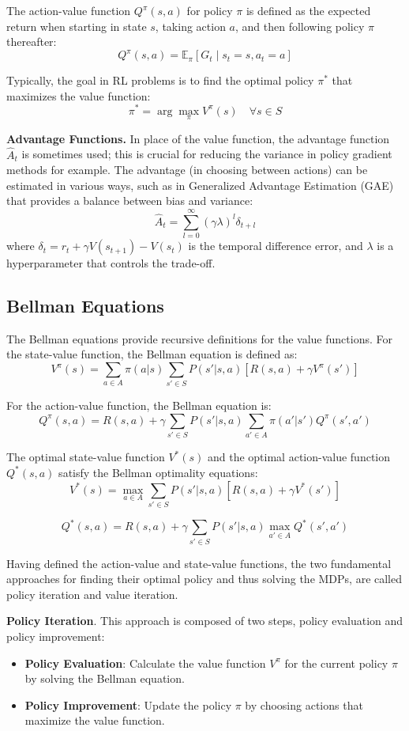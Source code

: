 The action-value function $Q^{\pi}(s, a)$ for policy $\pi$ is defined as the expected return when starting in state $s$, taking action $a$, and then following policy $\pi$ thereafter:
\[
Q^{\pi}(s, a) = \mathbb{E}_{\pi} \left[ G_t \mid s_t = s, a_t = a \right]
\]

Typically, the goal in \gls{RL} problems is to find the optimal policy $\pi^*$ that maximizes the value function:
\[
\pi^* = \arg\max_{\pi} V^{\pi}(s) \quad \forall s \in S
\]

\textbf{Advantage Functions.} In place of the value function, the advantage function $\hat{A}_t$ is sometimes used; this is crucial for reducing the variance in policy gradient methods for example.
The advantage (in choosing between actions) can be estimated in various ways, such as in Generalized Advantage Estimation (GAE) that provides a balance between bias and variance:
\[
\hat{A}_t = \sum_{l=0}^{\infty} (\gamma \lambda)^l \delta_{t+l}
\]
where $\delta_t = r_t + \gamma V(s_{t+1}) - V(s_t)$ is the temporal difference error, and $\lambda$ is a hyperparameter that controls the trade-off.

\subsection{Bellman Equations}

The Bellman equations provide recursive definitions for the value functions.
For the state-value function, the Bellman equation is defined as:
\[
V^{\pi}(s) = \sum_{a \in A} \pi(a|s) \sum_{s' \in S} P(s'|s,a) \left[ R(s,a) + \gamma V^{\pi}(s') \right]
\]

For the action-value function, the Bellman equation is:
\[
Q^{\pi}(s, a) = R(s,a) + \gamma \sum_{s' \in S} P(s'|s,a) \sum_{a' \in A} \pi(a'|s') Q^{\pi}(s', a')
\]

The optimal state-value function $V^*(s)$ and the optimal action-value function $Q^*(s, a)$ satisfy the Bellman optimality equations:
\[
V^*(s) = \max_{a \in A} \sum_{s' \in S} P(s'|s,a) \left[ R(s,a) + \gamma V^*(s') \right]
\]

\[
Q^*(s, a) = R(s,a) + \gamma \sum_{s' \in S} P(s'|s,a) \max_{a' \in A} Q^*(s', a')
\]

Having defined the action-value and state-value functions, the two fundamental approaches for finding their optimal policy and thus solving the MDPs, are called policy iteration and value iteration.

\textbf{Policy Iteration}. This approach is composed of two steps, policy evaluation and policy improvement:
\begin{itemize}
    \item \textbf{Policy Evaluation}: Calculate the value function $V^{\pi}$ for the current policy $\pi$ by solving the Bellman equation.
    \item \textbf{Policy Improvement}: Update the policy $\pi$ by choosing actions that maximize the value function.
\end{itemize}

